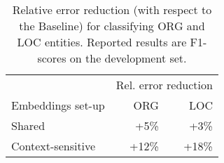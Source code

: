 \documentclass[../report.tex]{subfiles}
\begin{document}
\begin{table}[t]
\centering
{
\begin{tabular}{@{}lrr@{}}
\toprule
                         & \multicolumn{2}{c}{Rel. error reduction} \\ \cmidrule{2-3}
Embeddings set-up        & ORG        & LOC      \\ \midrule
Shared                   & +5\%       & +3\%     \\
Context-sensitive        & +12\%      & +18\%    \\
\bottomrule
\end{tabular}
}
\caption{
    Relative error reduction (with respect to the Baseline) for classifying ORG and LOC entities.
    Reported results are F1-scores on the development set.
}
\label{table:errors}
\end{table}
\end{document}
